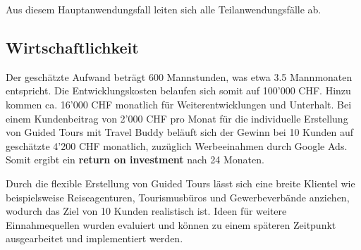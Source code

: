 Aus diesem Hauptanwendungsfall leiten sich alle Teilanwendungsfälle ab.

\subsection{Wirtschaftlichkeit}\label{Wirtschaftlichkeit}
Der geschätzte Aufwand beträgt 600 Mannstunden, was etwa 3.5 Mannmonaten entspricht. Die
Entwicklungskosten belaufen sich somit auf 100'000 CHF. Hinzu kommen ca. 16'000 CHF monatlich
für Weiterentwicklungen und Unterhalt. Bei einem Kundenbeitrag von 2'000 CHF pro Monat für
die individuelle Erstellung von Guided Tours mit Travel Buddy beläuft sich der Gewinn bei
10 Kunden auf geschätzte 4'200 CHF monatlich, zuzüglich Werbeeinahmen durch Google Ads.
Somit ergibt ein \textbf{return on investment} nach 24 Monaten.

Durch die flexible Erstellung von Guided Tours lässt sich eine breite Klientel wie beispielsweise
Reiseagenturen, Tourismusbüros und Gewerbeverbände  anziehen, wodurch das Ziel von 10 Kunden
realistisch ist. Ideen für weitere Einnahmequellen wurden evaluiert und können zu einem
späteren Zeitpunkt ausgearbeitet und implementiert werden.
